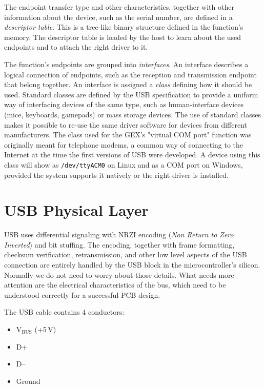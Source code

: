 The endpoint transfer type and other characteristics, together with other information about the device, such as the serial number, are defined in a \textit{descriptor table}. This is a tree-like binary structure defined in the function's memory. The descriptor table is loaded by the host to learn about the used endpoints and to attach the right driver to it.

The function's endpoints are grouped into \textit{interfaces}. An interface describes a logical connection of endpoints, such as the reception and transmission endpoint that belong together. An interface is assigned a \textit{class} defining how it should be used. Standard classes are defined by the USB specification to provide a uniform way of interfacing devices of the same type, such as human-interface devices (mice, keyboards, gamepads) or mass storage devices. The use of standard classes makes it possible to re-use the same driver software for devices from different manufacturers. The class used for the GEX's "virtual COM port" function was originally meant for telephone modems, a common way of connecting to the Internet at the time the first versions of USB were developed. A device using this class will show as \verb|/dev/ttyACM0| on Linux and as a COM port on Windows, provided the system supports it natively or the right driver is installed.


\section{USB Physical Layer}

USB uses differential signaling with NRZI encoding (\textit{Non Return to Zero Inverted}) and bit stuffing. The encoding, together with frame formatting, checksum verification, retransmission, and other low level aspects of the USB connection are entirely handled by the USB block in the microcontroller's silicon. Normally we do not need to worry about those details. What needs more attention are the electrical characteristics of the bus, which need to be understood correctly for a successful PCB design.

The USB cable contains 4 conductors:

\begin{itemize}\setlength\itemsep{.2em}
	\item V$_\mathrm{BUS}$ (+5\,V)
	\item D+
	\item D--
	\item Ground
\end{itemize}

